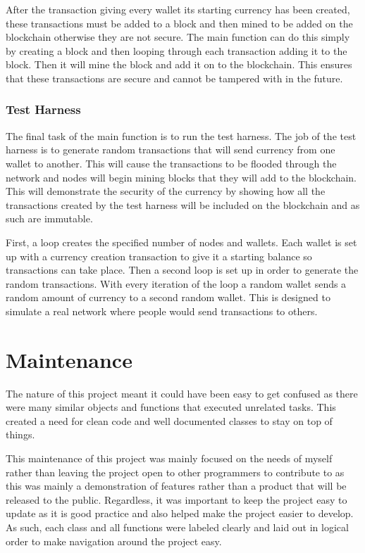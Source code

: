 \documentclass{l4proj}
\begin{document}
After the transaction giving every wallet its starting currency has been created, these transactions must be
added to a block and then mined to be added on the blockchain otherwise they are not secure. The main function
can do this simply by creating a block and then looping through each transaction adding it to the block. Then it will
mine the block and add it on to the blockchain. This ensures that these transactions are secure and cannot be tampered
with in the future.

\subsubsection{Test Harness}
The final task of the main function is to run the test harness. The job of the test harness is to generate 
random transactions that will send currency from one wallet to another. This will cause the transactions to 
be flooded through the network and nodes will begin mining blocks that they will add to the blockchain. This will
demonstrate the security of the currency by showing how all the transactions created by the test harness will
be included on the blockchain and as such are immutable.

First, a loop creates the specified number of nodes and wallets. Each wallet is set up with a currency
creation transaction to give it a starting balance so transactions can take place. Then a second loop is set up
in order to generate the random transactions. With every iteration of the loop a random wallet sends a random amount
of currency to a second random wallet. This is designed to simulate a real network where people would send
transactions to others.



\section{Maintenance}
The nature of this project meant it could have been easy to get confused as there were many similar objects and functions 
that executed unrelated tasks. This created a need for clean code and well documented classes to stay on top 
of things.

This maintenance of this project was mainly focused on the needs of myself rather than leaving the project open
to other programmers to contribute to as this was mainly a demonstration of features rather than a product that will
be released to the public. Regardless, it was important to keep the project easy to update as it is good practice
and also helped make the project easier to develop. As such, each class and all functions were labeled clearly
and laid out in logical order to make navigation around the project easy.
\end{document}
